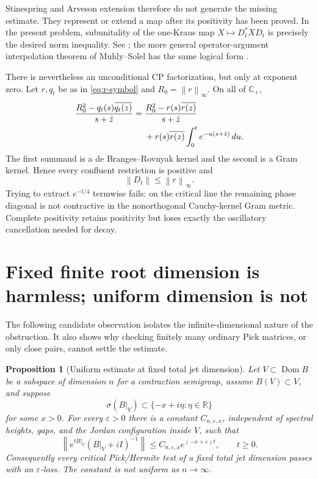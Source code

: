 \documentclass[11pt]{amsart}
\newtheorem{proposition}[theorem]{Proposition}
\theoremstyle{definition}
\theoremstyle{remark}
\DeclareMathOperator{\Dom}{Dom}
\newcommand{\C}{\mathbb C}
\newcommand{\R}{\mathbb R}
\newcommand{\eps}{\varepsilon}
\newcommand{\norm}[1]{\left\lVert #1\right\rVert}
\begin{document}
Stinespring and Arveson extension therefore do not generate the missing
estimate.  They represent or extend a map after its positivity has been
proved.  In the present problem, subunitality of the one-Kraus map
$X\mapsto D_t^*XD_t$ is precisely the desired norm inequality.  See
\cite{Arveson1969}; the more general operator-argument interpolation theorem
of Muhly--Solel has the same logical form \cite{MuhlySolel2004}.

There is nevertheless an unconditional CP factorization, but only at
exponent zero.  Let $r,q_t$ be as in \eqref{eq:r-symbol} and
$R_0=\norm r_\infty$.  On all of $\C_+$,
\begin{align}\label{eq:CP-zero-rate}
 \frac{R_0^2-q_t(s)\overline{q_t(z)}}{s+\bar z}
={}&
 \frac{R_0^2-r(s)\overline{r(z)}}{s+\bar z}
 \\
 &+r(s)\overline{r(z)}
   \int_0^t e^{-u(s+\bar z)}\,du.\notag
\end{align}
The first summand is a de Branges--Rovnyak kernel and the second is a Gram
kernel.  Hence every confluent restriction is positive and
\[
 \norm{D_t}\leq\norm r_\infty.
\]
Trying to extract $e^{-t/4}$ termwise fails: on the critical line the
remaining phase diagonal is not contractive in the nonorthogonal Cauchy-kernel
Gram metric.  Complete positivity retains positivity but loses exactly the
oscillatory cancellation needed for decay.

\section{Fixed finite root dimension is harmless; uniform dimension is not}
\label{sec:finite-dimension}

The following candidate observation isolates the infinite-dimensional nature
of the obstruction.  It also shows why checking finitely many ordinary Pick
matrices, or only close pairs, cannot settle the estimate.

\begin{proposition}[Uniform estimate at fixed total jet dimension]
\label{prop:finite-dimension}
Let $V\subset\Dom B$ be a subspace of dimension $n$ for a contraction
semigroup, assume $B(V)\subset V$, and suppose
\[
 \sigma(B|_V)\subset\{-x+i\eta:\eta\in\R\}
\]
for some $x>0$.  For every $\eps>0$ there is a constant
$C_{n,\eps,x}$, independent of spectral heights, gaps, and the Jordan
configuration inside $V$, such that
\[
 \norm{e^{tB|_V}(B|_V+iI)^{-1}}
 \leq C_{n,\eps,x}e^{(-x+\eps)t},
 \qquad t\geq0.
\]
Consequently every critical Pick/Hermite test of a fixed total jet dimension
passes with an $\eps$-loss.  The constant is not uniform as $n\to\infty$.
\end{proposition}
\end{document}
